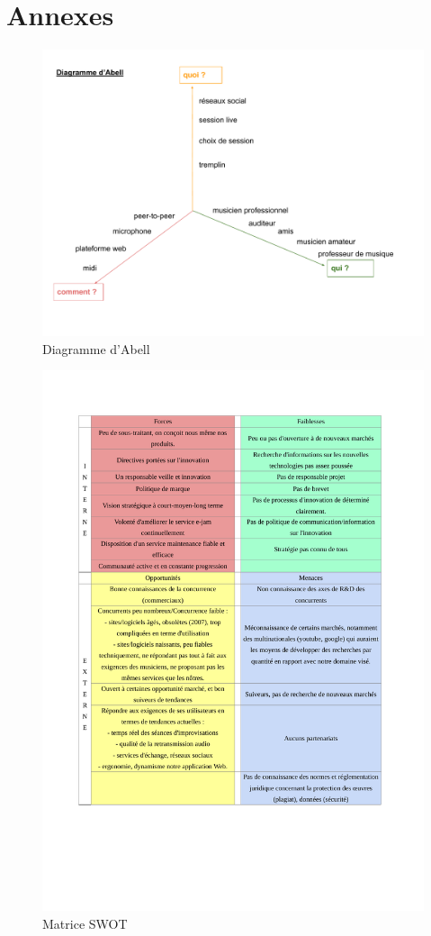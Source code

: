 \documentclass[a4,12pt]{article}
\begin{document}
\section{Annexes}

\begin{figure}[!h]
    \centering
    \includegraphics[width=400pt]{Abell.pdf}
    \caption{Diagramme d'Abell}
    \label{fig:diagrammeAbel}
\end{figure}

\begin{figure}[H]
    \centering
    \includegraphics[scale=0.7]{SWOT.pdf}
    \caption{Matrice SWOT}
    \label{fig:SWOT}
\end{figure}
\end{document}
